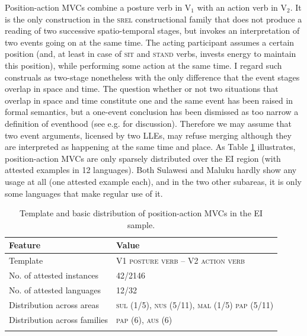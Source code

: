 Position-action MVCs combine a posture verb in V$_1$ with an action verb in V$_2$. It is the only construction in the \textsc{srel} constructional family that does not produce a reading of two successive spatio-temporal stages, but invokes an interpretation of two events going on at the same time. The acting participant assumes a certain position (and, at least in case of \textsc{sit} and \textsc{stand} verbs, invests energy to maintain this position), while performing some action at the same time. I regard such construals as two-stage nonetheless with the only difference that the event stages overlap in space and time. The question whether or not two situations that overlap in space and time constitute one and the same event has been raised in formal semantics, but a one-event conclusion has been dismissed as too narrow a definition of eventhood (see e.g. \citealt{maienborn2005limits} for discussion). Therefore we may assume that two event arguments, licensed by two LLEs, may refuse merging although they are interpreted as happening at the same time and place. As Table \ref{table:position-action} illustrates, position-action MVCs are only sparsely distributed over the EI region (with attested examples in 12 languages). Both Sulawesi and Maluku hardly show any usage at all (one attested example each), and in the two other subareas, it is only some languages that make regular use of it.

\begin{table}
\begin{tabular}{ll}
\lsptoprule
Feature&Value\tabularnewline
\midrule
Template&V1 \textsc{posture verb} -- V2 \textsc{action verb}\tabularnewline
No. of attested instances& 42/2146 \tabularnewline
No. of attested languages& 12/32 \tabularnewline
Distribution across areas& \textsc{sul} (1/5), \textsc{nus} (5/11), \textsc{mal} (1/5) \textsc{pap} (5/11) \tabularnewline
Distribution across families& \textsc{pap} (6), \textsc{aus} (6) \tabularnewline
\lspbottomrule
\end{tabular}
\caption[Template and basic distribution of position-action MVCs]{Template and basic distribution of position-action MVCs in the EI sample.}
\label{table:position-action}
\end{table}

